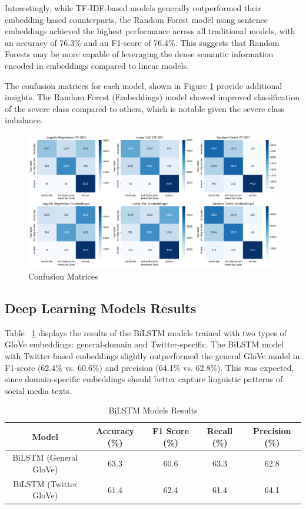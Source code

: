 Interestingly, while TF-IDF-based models generally outperformed their embedding-based counterparts, the Random Forest model using sentence embeddings achieved the highest performance across all traditional models, with an accuracy of 76.3\% and an F1-score of 76.4\%. This suggests that Random Forests may be more capable of leveraging the dense semantic information encoded in embeddings compared to linear models.

The confusion matrices for each model, shown in Figure \ref{Fig_2} provide additional insights. The Random Forest (Embeddings) model showed improved classification of the severe class compared to others, which is notable given the severe class imbalance.

\begin{figure}
    \centering
    \includegraphics[width=0.8\linewidth]{img/confusion-matrices.png}
    \caption{Confusion Matrices}
    \label{Fig_2}
\end{figure}

\subsection{Deep Learning Models Results}

Table ~\ref{Table_3} displays the results of the BiLSTM models trained with two types of GloVe embeddings: general-domain and Twitter-specific. The BiLSTM model with Twitter-based embeddings slightly outperformed the general GloVe model in F1-score (62.4\% vs. 60.6\%) and precision (64.1\% vs. 62.8\%). This was expected, since domain-specific embeddings should better capture linguistic patterns of social media texts.

\begin{table}
    \centering
    \caption{BiLSTM Models Results}
    \label{Table_3}
    \begin{tabular}{ccccc}
        \toprule
            \textbf{Model}          & 
            \textbf{Accuracy (\%)}  & 
            \textbf{F1 Score (\%)}  & 
            \textbf{Recall (\%)}    & 
            \textbf{Precision (\%)} \\
        \midrule
            BiLSTM (General GloVe)  & 63.3 & 60.6 & 63.3 & 62.8 \\
            BiLSTM (Twitter GloVe)  & 61.4 & 62.4 & 61.4 & 64.1 \\
        \bottomrule
    \end{tabular}
\end{table}

